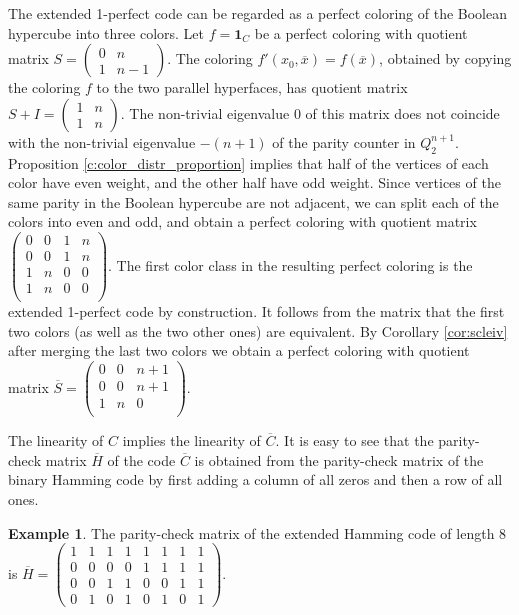 \documentclass[11pt]{article}
\theoremstyle{definition}
\newtheorem{example}{Example}[section]
\begin{document}
{{{The extended 1-perfect code can be regarded as a perfect coloring of the Boolean hypercube into three colors. Let $f={\mathbf 1}_C$ be a perfect coloring with quotient matrix $S=\begin{pmatrix}
0 & n\\
1 & n-1
\end{pmatrix}$. The coloring $f'(x_0,\overline{x})=
f(\overline{x})$, obtained by copying the coloring $f$ to the two parallel hyperfaces, has quotient matrix $S+I=\begin{pmatrix}
1 & n\\
1 & n
\end{pmatrix}$. The non-trivial eigenvalue $0$ of this matrix does not coincide with the non-trivial eigenvalue $-(n+1)$ of the  parity counter in $Q^{n+1}_2$.  Proposition \ref{c:color_distr_proportion} implies  that half of the vertices of each color have even weight, and the other half have odd weight. Since vertices of the same parity in the Boolean hypercube are not adjacent, we can split each of the colors into even and odd, and obtain a perfect coloring with quotient matrix $\begin{pmatrix}
0& 0 & 1 & n\\
0 & 0& 1 & n\\
1 & n & 0 & 0 \\
1 & n & 0 & 0 \\
\end{pmatrix}$. The first color class in the resulting perfect coloring is the extended 1-perfect code by construction. It follows from the matrix that  the first two  colors (as well as the two other ones) are equivalent. By Corollary \ref{cor:scleiv} after merging the  last two colors we obtain a perfect coloring with quotient matrix $\overline{S}=\begin{pmatrix}
0& 0 & n+1 \\
0 & 0& n+1 \\
1 & n & 0  \\
 \end{pmatrix}$.






The linearity of $C$ implies the linearity of  $\overline{C}$. It is easy to see that the parity-check matrix $\overline{H}$ of the code $\overline{C}$ is obtained from the parity-check matrix of the binary Hamming code by first adding a column of all zeros and then a row of all ones.

\begin{example}
The parity-check matrix of the extended Hamming code of length $8$ is
 $\overline{H}=\begin{pmatrix}
1 & 1& 1& 1& 1& 1& 1& 1\\
0 &0 & 0 & 0 & 1& 1 & 1 & 1\\
0& 0 & 1 & 1 & 0 & 0 & 1 & 1 \\
0 &1 & 0 & 1 & 0 & 1 & 0 & 1
\end{pmatrix}$.
\end{example}

}}}
\end{document}

